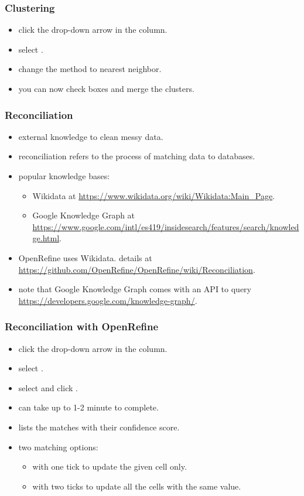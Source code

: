 \documentclass{beamer}					%
\begin{document}
\begin{frame}[c]
\frametitle{Clustering}
\begin{itemize}
\item click the drop-down arrow in the  column.
\item select \say{\textcolor{red}{Edit cells\textgreater Cluster and edit...}}.
\item change the method to nearest neighbor.
\item you can now check boxes and merge the clusters.
\end{itemize}
\end{frame}

\begin{frame}[c]
\frametitle{Reconciliation}
\begin{itemize}
\item external knowledge to clean messy data.
\item reconciliation refers to the process of matching data to databases. 
\item popular knowledge bases: 
\begin{itemize}
\item Wikidata at \footnotesize{\url{https://www.wikidata.org/wiki/Wikidata:Main_Page}}. 
\item Google Knowledge Graph at \footnotesize{\url{https://www.google.com/intl/es419/insidesearch/features/search/knowledge.html}}.
\end{itemize}
\item OpenRefine uses Wikidata. details at \footnotesize{\url{https://github.com/OpenRefine/OpenRefine/wiki/Reconciliation}}.
\item note that Google Knowledge Graph comes with an API to query \footnotesize{\url{https://developers.google.com/knowledge-graph/}}.
\end{itemize}
\end{frame}

\begin{frame}[c]
\frametitle{Reconciliation with OpenRefine}
\begin{itemize}
\item click the drop-down arrow in the   column.
\item select \say{\textcolor{red}{Reconcile\textgreater Start reconciling...}}.
\item select \say{\textcolor{red}{Wikidata}} and click \say{\textcolor{red}{Start Reconciling}}.
\item can take up to 1-2 minute to complete.
\item lists the matches with their confidence score.
\item two matching options: 
\begin{itemize}
\item with one tick to update the given cell only.
\item with two ticks to update all the cells with the same value.
\end{itemize}
\end{itemize}
\end{frame}
\end{document}
